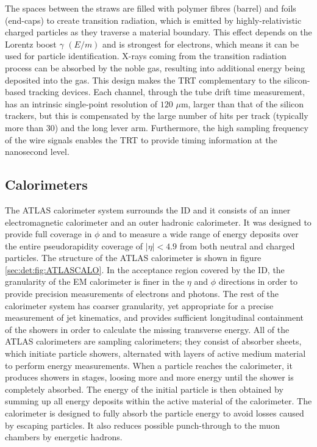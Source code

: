 The spaces between the straws are filled with polymer fibres (barrel) and foils (end-caps) to create transition radiation, which is emitted by highly-relativistic charged particles as they
traverse a material boundary. This effect depends on the Lorentz boost $\gamma$ $(E/m)$ and is strongest for electrons, which means it can be used for particle identification. X-rays coming from the transition radiation process can be absorbed by the noble gas, resulting into additional energy being deposited into the gas. This design  makes the TRT complementary to  the silicon-based tracking devices. Each channel, through the tube drift time measurement, has an intrinsic single-point resolution of $120$ $\mu$m, larger than that of the silicon trackers, but this is compensated by the large number of hits per track (typically more than 30) and the long lever arm.  Furthermore, the high sampling frequency of the wire signals enables the TRT to provide timing information at the nanosecond level.

\subsection{Calorimeters}
The ATLAS calorimeter system \cite{ATLASTDR1} surrounds the ID and it consists of an inner electromagnetic calorimeter and an outer hadronic calorimeter. It was designed to provide full coverage in $\phi$ and to measure a wide range of energy deposits over the entire pseudorapidity coverage of $|\eta|<4.9$ from both neutral and charged particles. The structure of the ATLAS calorimeter is shown in figure \ref{sec:det:fig:ATLASCALO}. In the acceptance region covered by the ID, the granularity of the EM calorimeter is finer in the $\eta$ and $\phi$ directions in order to provide precision measurements of electrons and photons. The rest of the calorimeter system has coarser granularity, yet appropriate for a precise measurement of jet kinematics, and provides sufficient longitudinal containment of the showers  in order to calculate the missing transverse energy.
All of the ATLAS calorimeters are sampling calorimeters; they consist of absorber sheets, which initiate particle showers, alternated with layers of active
medium material to perform energy measurements. When a particle reaches the calorimeter, it produces showers in stages, loosing more and more energy until the shower is completely absorbed. The energy of the initial particle is then obtained by summing up all energy deposits within the active material of the calorimeter. The calorimeter is designed to fully absorb the particle energy to avoid losses caused by escaping particles. It also reduces possible punch-through to the muon chambers by energetic hadrons.

